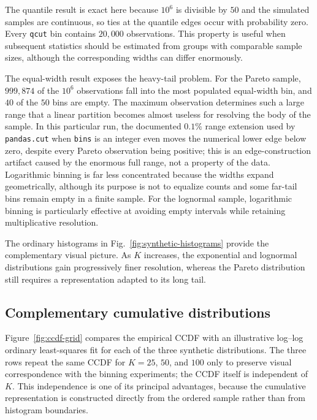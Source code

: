 \documentclass[12pt]{article}
\numberwithin{equation}{section}
\begin{document}
The quantile result is exact here because $10^6$ is divisible by $50$ and the simulated samples are continuous, so ties at the quantile edges occur with probability zero. Every \texttt{qcut} bin contains $20{,}000$ observations. This property is useful when subsequent statistics should be estimated from groups with comparable sample sizes, although the corresponding widths can differ enormously.

The equal-width result exposes the heavy-tail problem. For the Pareto sample, $999{,}874$ of the $10^6$ observations fall into the most populated equal-width bin, and $40$ of the $50$ bins are empty. The maximum observation determines such a large range that a linear partition becomes almost useless for resolving the body of the sample. In this particular run, the documented $0.1\%$ range extension used by \texttt{pandas.cut} when \texttt{bins} is an integer even moves the numerical lower edge below zero, despite every Pareto observation being positive; this is an edge-construction artifact caused by the enormous full range, not a property of the data. Logarithmic binning is far less concentrated because the widths expand geometrically, although its purpose is not to equalize counts and some far-tail bins remain empty in a finite sample. For the lognormal sample, logarithmic binning is particularly effective at avoiding empty intervals while retaining multiplicative resolution.

The ordinary histograms in Fig.~\ref{fig:synthetic-histograms} provide the complementary visual picture. As $K$ increases, the exponential and lognormal distributions gain progressively finer resolution, whereas the Pareto distribution still requires a representation adapted to its long tail.

\subsection{Complementary cumulative distributions}

Figure~\ref{fig:ccdf-grid} compares the empirical CCDF with an illustrative log--log ordinary least-squares fit for each of the three synthetic distributions. The three rows repeat the same CCDF for $K=25$, $50$, and $100$ only to preserve visual correspondence with the binning experiments; the CCDF itself is independent of $K$. This independence is one of its principal advantages, because the cumulative representation is constructed directly from the ordered sample rather than from histogram boundaries.
\end{document}
